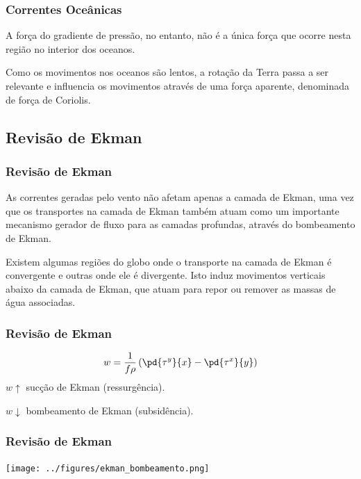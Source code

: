 \begin{frame}
\frametitle{Correntes Oceânicas}
  \begin{block}{}
    A força do gradiente de pressão, no entanto, não é a única força
    que ocorre nesta região no interior dos oceanos.
  \end{block}
  \pause
  \begin{block}{}
    Como os movimentos nos oceanos são lentos, a rotação da Terra passa
    a ser relevante e influencia os movimentos através de uma força
    aparente, denominada de força de Coriolis.
  \end{block}
\end{frame}

\subsection{Revisão de Ekman}
\begin{frame}
\frametitle{Revisão de Ekman}
\small{
 \begin{block}{}
  As correntes geradas pelo vento não afetam apenas a camada de Ekman,
  uma vez que os transportes na camada de Ekman também atuam como um
  importante mecanismo gerador de fluxo para as camadas profundas,
  através do bombeamento de Ekman.
 \end{block}
\pause
\begin{block}{}
  Existem algumas regiões do globo onde o transporte na camada de Ekman é convergente e outras onde ele é divergente. Isto induz movimentos verticais abaixo da camada de Ekman, que atuam para repor ou remover as massas de água associadas.
\end{block}
}
\end{frame}

\begin{frame}
\frametitle{Revisão de Ekman}
 \begin{block}{}
 \[ w = \frac{1}{f\rho} \left( \pd{\tau^y}{x} - \pd{\tau^x}{y} \right)\]
  \vspace{1cm}
 $w \uparrow$ sucção de Ekman (ressurgência).

 $w \downarrow$ bombeamento de Ekman (subsidência).
 \end{block}
\end{frame}


\begin{frame}
  \frametitle{Revisão de Ekman}
  \begin{center}
    \texttt{[image: ../figures/ekman\_bombeamento.png]}
  \end{center}
\end{frame}


